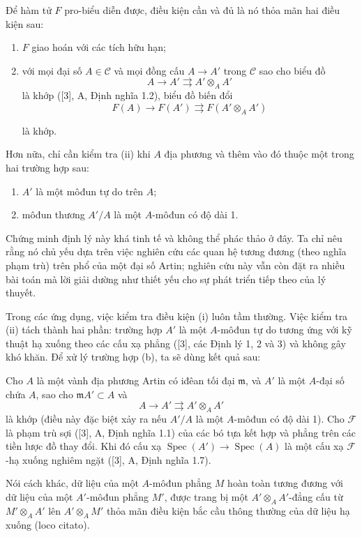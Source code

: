  Để hàm tử $F$ pro-biểu diễn được, điều kiện cần và đủ là
nó thỏa mãn hai điều kiện sau:
\begin{enumerate}
\item[(i)] $F$ giao hoán với các tích hữu hạn;
\item[(ii)] với mọi đại số $A\in\mathcal C$ và mọi đồng cấu
$A\longrightarrow A'$ trong $\mathcal C$ sao cho biểu đồ
\[
  A\longrightarrow A'\rightrightarrows A'\otimes_A A'
\]
là khớp ([3], A, Định nghĩa 1.2), biểu đồ biến đổi
\[
  F(A)\longrightarrow F(A')\rightrightarrows F(A'\otimes_A A')
\]

là khớp.
\end{enumerate}
Hơn nữa, chỉ cần kiểm tra (ii) khi $A$ địa phương và thêm vào đó thuộc một
trong hai trường hợp sau:
\begin{enumerate}
\item[(a)] $A'$ là một môđun tự do trên $A$;
\item[(b)] môđun thương $A'/A$ là một $A$-môđun có độ dài 1.
\end{enumerate}

Chứng minh định lý này khá tinh tế và không thể phác thảo ở đây. Ta chỉ nêu
rằng nó chủ yếu dựa trên việc nghiên cứu các quan hệ tương đương (theo nghĩa
phạm trù) trên phổ của một đại số Artin; nghiên cứu này vẫn còn đặt ra nhiều
bài toán mà lời giải dường như thiết yếu cho sự phát triển tiếp theo của lý
thuyết.

Trong các ứng dụng, việc kiểm tra điều kiện (i) luôn tầm thường. Việc kiểm tra
(ii) tách thành hai phần: trường hợp $A'$ là một $A$-môđun tự do tương ứng
với kỹ thuật hạ xuống theo các cấu xạ phẳng ([3], các Định lý 1, 2 và 3) và
không gây khó khăn. Để xử lý trường hợp (b), ta sẽ dùng kết quả sau:

 Cho $A$ là một vành địa phương Artin có iđêan tối đại
$\mathfrak m$, và $A'$ là một $A$-đại số chứa $A$, sao cho
$\mathfrak mA'\subset A$ và
\[
  A\longrightarrow A'\rightrightarrows A'\otimes_A A'
\]
là khớp (điều này đặc biệt xảy ra nếu $A'/A$ là một $A$-môđun có độ dài 1).
Cho $\mathcal F$ là phạm trù sợi ([3], A, Định nghĩa 1.1) của các bó tựa kết
hợp và phẳng trên các tiền lược đồ thay đổi. Khi đó cấu xạ
$\operatorname{Spec}(A')\longrightarrow\operatorname{Spec}(A)$ là một cấu
xạ $\mathcal F$-hạ xuống nghiêm ngặt ([3], A, Định nghĩa 1.7).

Nói cách khác, dữ liệu của một $A$-môđun phẳng $M$ hoàn toàn tương đương với
dữ liệu của một $A'$-môđun phẳng $M'$, được trang bị một
$A'\otimes_AA'$-đẳng cấu từ $M'\otimes_AA'$ lên $A'\otimes_AM'$ thỏa mãn
điều kiện bắc cầu thông thường của dữ liệu hạ xuống (loco citato).


